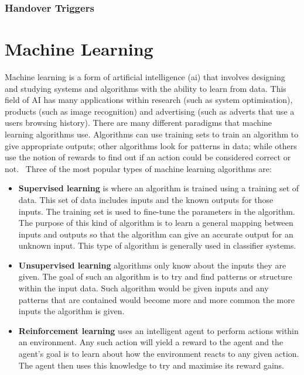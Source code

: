 \documentclass[12pt, oneside]{report}
\begin{document}
\subsection{Handover Triggers}\label{handover triggers}

\chapter{Machine Learning}\label{machine learning}
Machine learning is a form of artificial intelligence (\ac{ai}) that involves designing and studying systems and algorithms with the ability to learn from data. This field of AI has many applications within research (such as system optimisation), products (such as image recognition) and advertising (such as adverts that use a users browsing history). There are many different paradigms that machine learning algorithms use. Algorithms can use training sets to train an algorithm to give appropriate outputs; other algorithms look for patterns in data; while others use the notion of rewards to find out if an action could be considered correct or not.~\cite{alpaydin2010introduction} Three of the most popular types of machine learning algorithms are:

\begin{itemize}
  \item \textbf{Supervised learning} is where an algorithm is trained using a training set of data. This set of data includes inputs and the known outputs for those inputs. The training set is used to fine-tune the parameters in the algorithm. The purpose of this kind of algorithm is to learn a general mapping between inputs and outputs so that the algorithm can give an accurate output for an unknown input. This type of algorithm is generally used in classifier systems.
  \item \textbf{Unsupervised learning} algorithms only know about the inputs they are given. The goal of such an algorithm is to try and find patterns or structure within the input data. Such algorithm would be given inputs and any patterns that are contained would become more and more common the more inputs the algorithm is given.
  \item \textbf{Reinforcement learning} uses an intelligent agent to perform actions within an environment. Any such action will yield a reward to the agent and the agent’s goal is to learn about how the environment reacts to any given action. The agent then uses this knowledge to try and maximise its reward gains.
\end{itemize}
\end{document}
